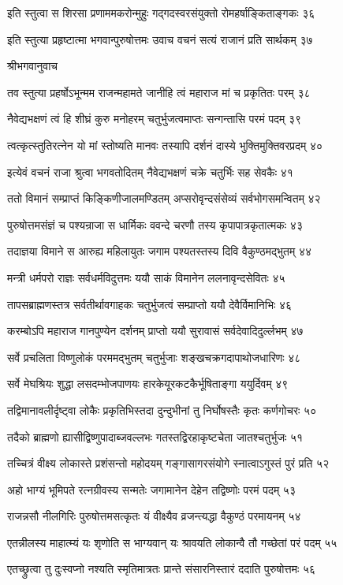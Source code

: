 इति स्तुत्वा स शिरसा प्रणाममकरोन्मुहुः
गद्गदस्वरसंयुक्तो रोमहर्षाङ्किताङ्गकः ३६

इति स्तुत्या प्रहृष्टात्मा भगवान्पुरुषोत्तमः
उवाच वचनं सत्यं राजानं प्रति सार्थकम् ३७

श्रीभगवानुवाच

तव स्तुत्या प्रहर्षोऽभून्मम राजन्महामते
जानीहि त्वं महाराज मां च प्रकृतितः परम् ३८

नैवेद्यभक्षणं त्वं हि शीघ्रं कुरु मनोहरम्
चतुर्भुजत्वमाप्तः सन्गन्तासि परमं पदम् ३९

त्वत्कृत्स्तुतिरत्नेन यो मां स्तोष्यति मानवः
तस्यापि दर्शनं दास्ये भुक्तिमुक्तिवरप्रदम् ४०

इत्येवं वचनं राजा श्रुत्वा भगवतोदितम्
नैवेद्यभक्षणं चक्रे चतुर्भिः सह सेवकैः ४१

ततो विमानं सम्प्राप्तं किङ्किणीजालमण्डितम्
अप्सरोवृन्दसंसेव्यं सर्वभोगसमन्वितम् ४२

पुरुषोत्तमसंज्ञं च पश्यन्राजा स धार्मिकः
ववन्दे चरणौ तस्य कृपापात्रकृतात्मकः ४३

तदाज्ञया विमाने स आरुह्य महिलायुतः
जगाम पश्यतस्तस्य दिवि वैकुण्ठमद्भुतम् ४४

मन्त्री धर्मपरो राज्ञः सर्वधर्मविदुत्तमः
ययौ साकं विमानेन ललनावृन्दसेवितः ४५

तापसब्राह्मणस्तत्र सर्वतीर्थावगाहकः
चतुर्भुजत्वं सम्प्राप्तो ययौ देवैर्विमानिभिः ४६

करम्बोऽपि महाराज गानपुण्येन दर्शनम्
प्राप्तो ययौ सुरावासं सर्वदेवादिदुर्ल्लभम् ४७

सर्वे प्रचलिता विष्णुलोकं परममद्भुतम्
चतुर्भुजाः शङ्खचक्रगदापाथोजधारिणः ४८

सर्वे मेघश्रियः शुद्धा लसदम्भोजपाणयः
हारकेयूरकटकैर्भूषिताङ्गा ययुर्दिवम् ४९

तद्विमानावलीर्दृष्ट्वा लोकैः प्रकृतिभिस्तदा
दुन्दुभीनां तु निर्घोषस्तैः कृतः कर्णगोचरः ५०

तदैको ब्राह्मणो ह्यासीद्विष्णुपादाब्जवल्लभः
गतस्तद्विरहाकृष्टचेता जातश्चतुर्भुजः ५१

तच्चित्रं वीक्ष्य लोकास्ते प्रशंसन्तो महोदयम्
गङ्गासागरसंयोगे स्नात्वाऽगुस्तं पुरं प्रति ५२

अहो भाग्यं भूमिपते रत्नग्रीवस्य सन्मतेः
जगामानेन देहेन तद्विष्णोः परमं पदम् ५३

राजन्नसौ नीलगिरिः पुरुषोत्तमसत्कृतः
यं वीक्ष्यैव व्रजन्त्यद्धा वैकुण्ठं परमायनम् ५४

एतन्नीलस्य माहात्म्यं यः शृणोति स भाग्यवान्
यः श्रावयति लोकान्वै तौ गच्छेतां परं पदम् ५५

एतच्छ्रुत्वा तु दुःस्वप्नो नश्यति स्मृतिमात्रतः
प्रान्ते संसारनिस्तारं ददाति पुरुषोत्तमः ५६

